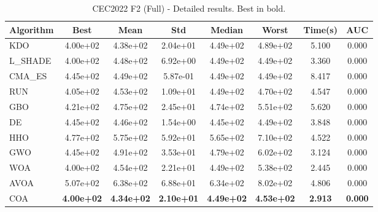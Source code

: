 \begin{table}[H]
\centering\small
\caption{CEC2022 F2 (Full) - Detailed results. Best in bold.}
\label{tab:cec2022_F2}
\begin{tabular}{lccccccc}
\toprule
\textbf{Algorithm} & \textbf{Best} & \textbf{Mean} & \textbf{Std} & \textbf{Median} & \textbf{Worst} & \textbf{Time(s)} & \textbf{AUC} \\
\midrule
KDO & 4.00e+02 & 4.38e+02 & 2.04e+01 & 4.49e+02 & 4.89e+02 & 5.100 & 0.000 \\
L_SHADE & 4.00e+02 & 4.48e+02 & 6.92e+00 & 4.49e+02 & 4.49e+02 & 3.360 & 0.000 \\
CMA_ES & 4.45e+02 & 4.49e+02 & 5.87e-01 & 4.49e+02 & 4.49e+02 & 8.417 & 0.000 \\
RUN & 4.05e+02 & 4.53e+02 & 1.09e+01 & 4.49e+02 & 4.70e+02 & 4.547 & 0.000 \\
GBO & 4.21e+02 & 4.75e+02 & 2.45e+01 & 4.74e+02 & 5.51e+02 & 5.620 & 0.000 \\
DE & 4.45e+02 & 4.46e+02 & 1.54e+00 & 4.45e+02 & 4.49e+02 & 3.848 & 0.000 \\
HHO & 4.77e+02 & 5.75e+02 & 5.92e+01 & 5.65e+02 & 7.10e+02 & 4.522 & 0.000 \\
GWO & 4.45e+02 & 4.91e+02 & 3.53e+01 & 4.79e+02 & 6.02e+02 & 3.124 & 0.000 \\
WOA & 4.00e+02 & 4.54e+02 & 2.21e+01 & 4.49e+02 & 5.38e+02 & 2.445 & 0.000 \\
AVOA & 5.07e+02 & 6.38e+02 & 6.88e+01 & 6.34e+02 & 8.02e+02 & 4.806 & 0.000 \\
COA & \textbf{4.00e+02} & \textbf{4.34e+02} & \textbf{2.10e+01} & \textbf{4.49e+02} & \textbf{4.53e+02} & \textbf{2.913} & \textbf{0.000} \\
\bottomrule
\end{tabular}
\end{table}
